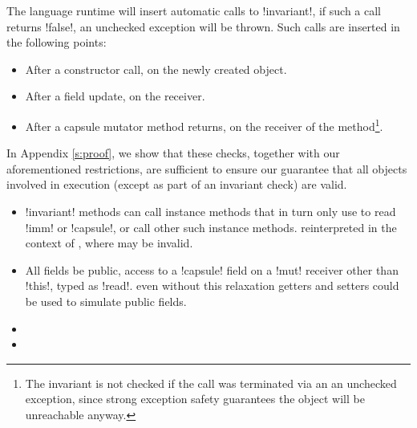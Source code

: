 The language runtime will insert automatic calls to \Q!invariant!, if such a call returns \Q!false!, an unchecked exception will be thrown. Such calls are inserted in the following points:
\begin{itemize}
	\item After a constructor call, on the newly created object.
	\item After a field update, on the receiver.
	\item After a capsule mutator method returns, on the receiver of the method\footnote{The invariant is not checked if the call was terminated via an an unchecked exception, since strong exception safety guarantees the object will be unreachable anyway.}.
\end{itemize}

\noindent In Appendix \ref{s:proof}, we show that these checks, together with our aforementioned restrictions, are sufficient to ensure our guarantee that all objects involved in execution (except as part of an invariant check) are valid.

\begin{itemize}
	\item \Q!invariant! methods can  call instance methods that in turn only use \Q@this@ to read \Q!imm! or \Q!capsule!, or call other such instance methods.
	 reinterpreted in the context of \Q@invariant@, where \Q@this@ may be invalid. 
	
	\item {} All fields   be public,  access to a \Q!capsule! field on a \Q!mut! receiver\IO{,} other than \Q!this!,  typed as \Q!read!.  even without this relaxation getters and setters could be used to simulate public fields.
	\item {}
	\item {}
\end{itemize}

